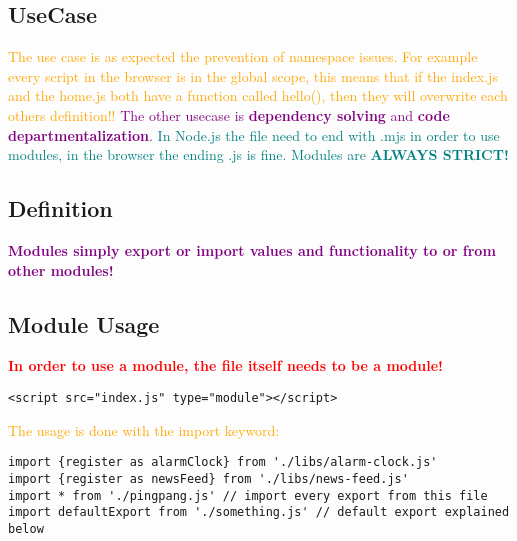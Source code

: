 \documentclass[main.tex,fontsize=6pt,paper=a4,paper=landscape,DIV=calc,]{scrartcl}
\begin{document}
\begin{multicols*}{4}
\subsection{UseCase}  
\textcolor{orange}{The use case is as expected the prevention of namespace issues.\newline
For example every script in the browser is in the global scope, this means that if the index.js and the home.js both have a function called hello(), then they will overwrite each others definition!!}\newline
\textcolor{purple}{The other usecase is \textbf{dependency solving} and \textbf{code departmentalization}.}\newline
\textcolor{teal}{In Node.js the file need to end with .mjs in order to use modules, in the browser the ending .js is fine.}\newline
\textcolor{teal}{Modules are \textbf{ALWAYS STRICT!}}

\subsection{Definition}  
\textcolor{purple}{\textbf{Modules simply export or import values and functionality to or from other modules!}}

\subsection{Module Usage}  
\textcolor{red}{\textbf{In order to use a module, the file itself needs to be a module!}}\newline
\vspace{-2mm}
\begin{lstlisting}
<script src="index.js" type="module"></script>
\end{lstlisting}
\vspace{2mm}
\textcolor{orange}{The usage is done with the import keyword:}\newline
\vspace{-2mm}
\begin{lstlisting}
import {register as alarmClock} from './libs/alarm-clock.js'
import {register as newsFeed} from './libs/news-feed.js'
import * from './pingpang.js' // import every export from this file 
import defaultExport from './something.js' // default export explained below
\end{lstlisting}
\vspace{2mm}


\end{multicols*}
\end{document}
